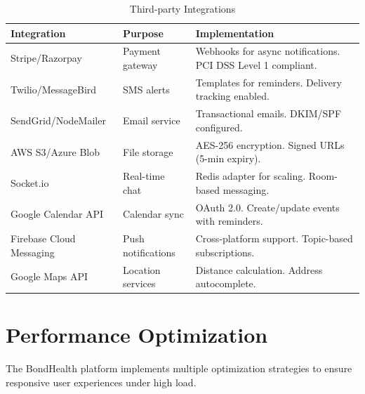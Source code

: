 \begin{table}[H]
    \small
    \centering
    \renewcommand{\arraystretch}{1.3}
    \begin{tabular}{|>{\raggedright\arraybackslash}p{3.0cm}|>{\raggedright\arraybackslash}p{2.8cm}|>{\raggedright\arraybackslash}p{7.6cm}|}
        \hline
        \textbf{Integration} & \textbf{Purpose} & \textbf{Implementation} \\
        \hline
        Stripe/\allowbreak Razorpay
            & Payment gateway
            & Webhooks for async notifications. PCI DSS Level 1 compliant. \\
        \hline
        Twilio/\allowbreak MessageBird
            & SMS alerts
            & Templates for reminders. Delivery tracking enabled. \\
        \hline
        SendGrid/\allowbreak NodeMailer
            & Email service
            & Transactional emails. DKIM/SPF configured. \\
        \hline
        AWS S3/\allowbreak Azure Blob
            & File storage
            & AES-256 encryption. Signed URLs (5-min expiry). \\
        \hline
        Socket.io
            & Real-time chat
            & Redis adapter for scaling. Room-based messaging. \\
        \hline
        Google Calendar API
            & Calendar sync
            & OAuth 2.0. Create/update events with reminders. \\
        \hline
        Firebase Cloud Messaging
            & Push notifications
            & Cross-platform support. Topic-based subscriptions. \\
        \hline
        Google Maps API
            & Location services
            & Distance calculation. Address autocomplete. \\
        \hline
    \end{tabular}
    \caption{Third-party Integrations}
    \label{tab:integrations}
\end{table}


\section{Performance Optimization}

\justifying
The BondHealth platform implements multiple optimization strategies to ensure responsive
user experiences under high load.

